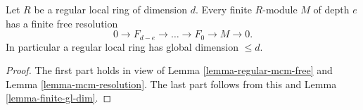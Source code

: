 \begin{proposition}
\label{proposition-regular-finite-gl-dim}
Let $R$ be a regular local ring of dimension $d$.
Every finite $R$-module $M$ of depth $e$ has a finite free
resolution
$$
0 \to F_{d-e} \to \ldots \to F_0 \to M \to 0.
$$
In particular a regular local ring has global dimension $\leq d$.
\end{proposition}

\begin{proof}
The first part holds in view of Lemma \ref{lemma-regular-mcm-free}
and Lemma \ref{lemma-mcm-resolution}. The last part follows from this
and Lemma \ref{lemma-finite-gl-dim}.
\end{proof}

